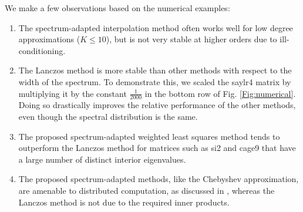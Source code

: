 \documentclass{article}
\begin{document}
We make a few observations based on the numerical examples: %
\begin{enumerate}
\item The spectrum-adapted interpolation method often works well for low degree approximations ($K\leq 10$), but is not very stable at higher orders due to ill-conditioning.
\item The Lanczos method is more stable than other methods with respect to the width of the spectrum. To demonstrate this, we scaled the saylr4 matrix by multiplying it by the constant $\frac{1}{2000}$ in the bottom row of Fig. \ref{Fig:numerical}. Doing so drastically improves the relative performance of the other methods, even though the spectral distribution is the same.
\item The proposed spectrum-adapted weighted least squares method tends to outperform the Lanczos method for matrices such as si2 and cage9 that have a large number of distinct interior eigenvalues.
\item The proposed spectrum-adapted methods, like the Chebyshev approximation, are amenable to distributed computation, as discussed in \cite{shuman_distributed_SIPN_2018}, whereas the Lanczos method is not due to the required inner products. 
\end{enumerate}
\end{document}
